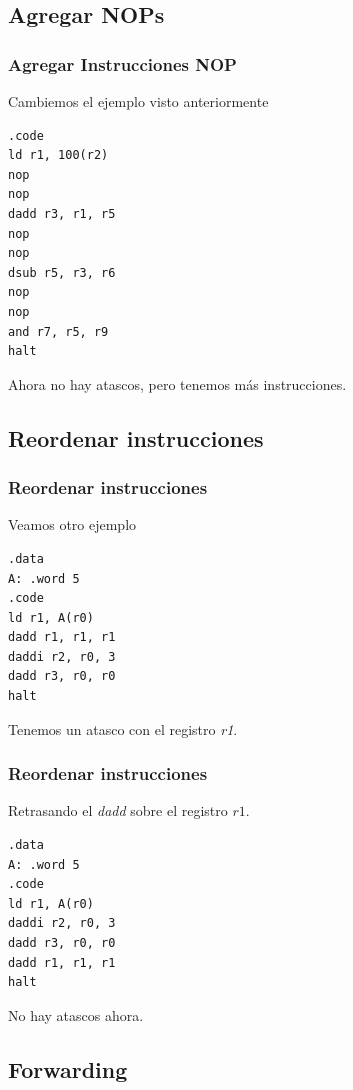 \documentclass{beamer}
\begin{document}
\subsection{Agregar NOPs}
\begin{frame}[fragile]
\frametitle{Agregar Instrucciones NOP}

Cambiemos el ejemplo visto anteriormente
\begin{block}{}
\begin{lstlisting}[basicstyle=\ttfamily,keywordstyle=\color{blue}]
.code
ld r1, 100(r2)
nop
nop
dadd r3, r1, r5
nop
nop
dsub r5, r3, r6
nop
nop
and r7, r5, r9
halt
\end{lstlisting}
\end{block}
Ahora no hay atascos, pero tenemos más instrucciones.
\end{frame}



\subsection{Reordenar instrucciones}
\begin{frame}[fragile]
\frametitle{Reordenar instrucciones}

Veamos otro ejemplo
\begin{block}{}
\begin{lstlisting}[basicstyle=\ttfamily,keywordstyle=\color{blue}]
.data
A: .word 5
.code
ld r1, A(r0)
dadd r1, r1, r1
daddi r2, r0, 3
dadd r3, r0, r0
halt
\end{lstlisting}
\end{block}
Tenemos un atasco con el registro \emph{r1}.

\end{frame}


\begin{frame}[fragile]
\frametitle{Reordenar instrucciones}
Retrasando el \emph{dadd} sobre el registro $r1$.
\begin{block}{}
\begin{lstlisting}[basicstyle=\ttfamily,keywordstyle=\color{blue}]
.data
A: .word 5
.code
ld r1, A(r0)
daddi r2, r0, 3
dadd r3, r0, r0
dadd r1, r1, r1
halt
\end{lstlisting}
\end{block}
No hay atascos ahora.
\end{frame}



\subsection{Forwarding}
\end{document}
